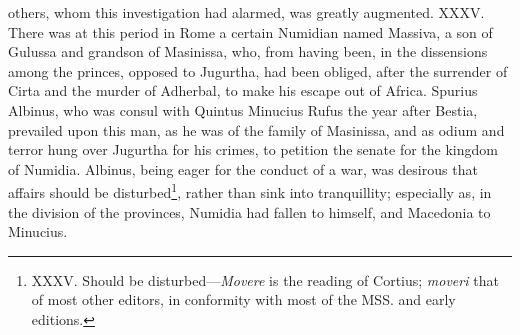 others, whom this investigation had alarmed, was greatly augmented.
XXXV. There was at this period in Rome a certain Numidian named
Massiva, a son of Gulussa and grandson of Masinissa, who, from having
been, in the dissensions among the princes, opposed to Jugurtha, had
been obliged, after the surrender of Cirta and the murder of Adherbal,
to make his escape out of Africa. Spurius Albinus, who was consul with
Quintus Minucius Rufus the year after Bestia, prevailed upon this man,
as he was of the family of Masinissa, and as odium and terror hung
over Jugurtha for his crimes, to petition the senate for the kingdom
of Numidia. Albinus, being eager for the conduct of a war, was
desirous that affairs should be disturbed\footnote{XXXV. Should be disturbed—\emph{Movere} is the reading of Cortius;
\emph{moveri} that of most other editors, in conformity with most of the MSS.
and early editions.}, rather than sink into
tranquillity; especially as, in the division of the provinces, Numidia
had fallen to himself, and Macedonia to Minucius.

